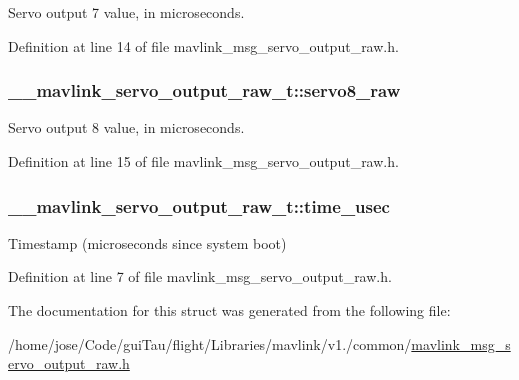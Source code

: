 Servo output 7 value, in microseconds. 



Definition at line 14 of file mavlink\-\_\-msg\-\_\-servo\-\_\-output\-\_\-raw.\-h.

\hypertarget{struct____mavlink__servo__output__raw__t_a1bf5dcc6a436529fc0d89ebf56d2a980}{
\subsubsection[{servo8\-\_\-raw}]{ \-\_\-\-\_\-mavlink\-\_\-servo\-\_\-output\-\_\-raw\-\_\-t\-::servo8\-\_\-raw}}\label{struct____mavlink__servo__output__raw__t_a1bf5dcc6a436529fc0d89ebf56d2a980}


Servo output 8 value, in microseconds. 



Definition at line 15 of file mavlink\-\_\-msg\-\_\-servo\-\_\-output\-\_\-raw.\-h.

\hypertarget{struct____mavlink__servo__output__raw__t_a77950505a736593e2c35132a1688c8f1}{
\subsubsection[{time\-\_\-usec}]{ \-\_\-\-\_\-mavlink\-\_\-servo\-\_\-output\-\_\-raw\-\_\-t\-::time\-\_\-usec}}\label{struct____mavlink__servo__output__raw__t_a77950505a736593e2c35132a1688c8f1}


Timestamp (microseconds since system boot) 



Definition at line 7 of file mavlink\-\_\-msg\-\_\-servo\-\_\-output\-\_\-raw.\-h.



The documentation for this struct was generated from the following file\-:\begin{DoxyCompactItemize}
\item 
/home/jose/\-Code/gui\-Tau/flight/\-Libraries/mavlink/v1./common/\hyperlink{mavlink__msg__servo__output__raw_8h}{mavlink\-\_\-msg\-\_\-servo\-\_\-output\-\_\-raw.\-h}\end{DoxyCompactItemize}
